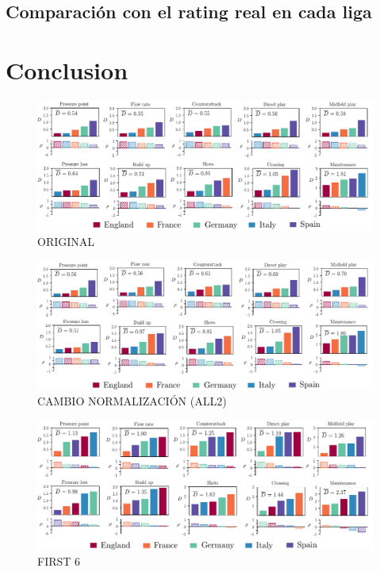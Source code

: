 \documentclass[]{article}
\begin{document}
\subsection{Comparación con el rating real en cada liga}


\section{Conclusion}



\begin{figure}[t!]
\centering
\includegraphics[width=1.\textwidth]{metricas.pdf}
\caption{ORIGINAL}
\label{}
\end{figure}


\begin{figure}[t!]
\centering
\includegraphics[width=1.\textwidth]{fig_all_2.pdf}
\caption{CAMBIO NORMALIZACIÓN (ALL2) }
\label{}
\end{figure}


\begin{figure}[t!]
\centering
\includegraphics[width=1.\textwidth]{ffig_first6.pdf}
\caption{FIRST 6}
\label{}
\end{figure}
\end{document}
